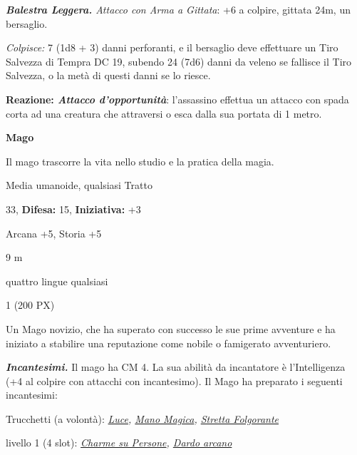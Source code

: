 \begin{multicols}{2}
{\emph{\textbf{Balestra Leggera.} Attacco con Arma a Gittata}: +6 a colpire, gittata 24m, un bersaglio.

\emph{Colpisce:} 7 (1d8 + 3) danni perforanti, e il bersaglio deve effettuare un Tiro Salvezza di Tempra DC 19, subendo 24 (7d6) danni da veleno se fallisce il Tiro Salvezza, o la metà di questi danni se lo riesce.

\textbf{Reazione: \emph{Attacco d'opportunità}}: l'assassino effettua un attacco con spada corta ad una creatura che attraversi o esca dalla sua portata di 1 metro.

\medskip\textbf{Mago}

Il mago trascorre la vita nello studio e la pratica della magia.

\begin{description}[noitemsep, topsep=0pt, parsep=0pt, partopsep=0pt, leftmargin=0cm, labelwidth=2.2cm]
    \item[\textbf{Taglia/Tipo:}] Media umanoide, qualsiasi Tratto
    \item[\textbf{Caratt.:}] 
    \item[\textbf{Punti Ferita:}] 33,  \textbf{Difesa:} 15,  \textbf{Iniziativa:} +3
    \item[\textbf{Comp.:}] Arcana +5, Storia +5
    \item[\textbf{Tiri Salvez.:}] 
    \item[\textbf{Movimento:}] 9 m
    \item[\textbf{Linguaggi:}] quattro lingue qualsiasi
    \item[\textbf{Sfida:}] 1 (200 PX)\smallskip
\end{description}

Un Mago novizio, che ha superato con successo le sue prime avventure e ha iniziato a stabilire una reputazione come nobile o famigerato avventuriero.

\emph{\textbf{Incantesimi.}} Il mago ha CM 4. La sua abilità da incantatore è l'Intelligenza (+4 al colpire con attacchi con incantesimo). Il Mago ha preparato i seguenti incantesimi:

Trucchetti (a volontà): \emph{\hyperlink{Luce}{Luce}, \hyperlink{Mano Magica}{Mano Magica}, \hyperlink{Stretta Folgorante}{Stretta Folgorante}}

livello 1 (4 slot): \emph{\hyperlink{Charme su Persone}{Charme su Persone},  \hyperlink{Dardo arcano}{Dardo arcano}}

}
\end{multicols}
